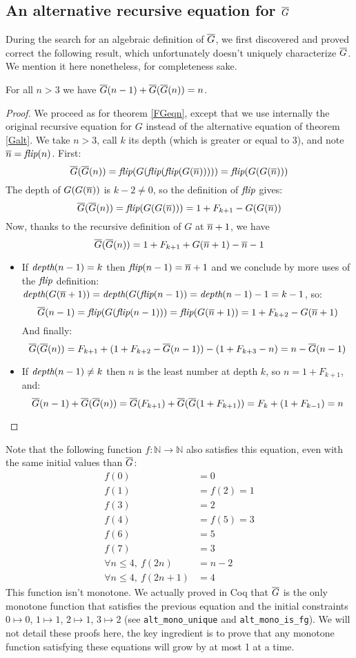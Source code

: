 \documentclass[a4paper,11pt]{article}
\begin{document}
\subsection{An alternative recursive equation for $\overline{G}$}

During the search for an algebraic definition of $\overline{G}$, we
first discovered and proved correct the following result,
which unfortunately doesn't uniquely characterize $\overline{G}$.
We mention it here nonetheless, for completeness sake.

\begin{theorem}
For all $n>3$ we have $\overline{G}(n-1) +\overline{G}(\overline{G}(n)) = n$.
\end{theorem}
\begin{proof}
We proceed as for theorem \ref{FGeqn}, except that we
use internally the original recursive equation for $G$
instead of the alternative equation of theorem \ref{Galt}.
We take $n>3$, call $k$ its depth (which is greater or equal to 3),
and note $\overline{n} = \textit{flip}(n)$. First:
$$\overline{G}(\overline{G}(n))=\textit{flip}(G(\textit{flip}(\textit{flip}(G(\overline{n})))))=\textit{flip}(G(G(\overline{n})))$$
The depth of $G(G(\overline{n}))$ is $k-2\neq 0$, so the definition
of $\textit{flip}$ gives:
$$\overline{G}(\overline{G}(n)) = \textit{flip}(G(G(\overline{n}))) = 1+F_{k+1}-G(G(\overline{n}))$$
Now, thanks to the recursive definition of $G$ at $\overline{n}+1$, we have
$$\overline{G}(\overline{G}(n)) = 1+F_{k+1}+G(\overline{n}+1)-\overline{n}-1$$
\begin{itemize}
\item If $\textit{depth}(n-1)=k$ then $\textit{flip}(n-1)=\overline{n}+1$ and we
conclude by more uses of the $\textit{flip}$ definition:
$\textit{depth}(G(\overline{n}+1))=\textit{depth}(G(\textit{flip}(n-1))=\textit{depth}(n-1)-1=k-1$, so:
$$\overline{G}(n-1)=\textit{flip}(G(\textit{flip}(n-1)))=\textit{flip}(G(\overline{n}+1))= 1+F_{k+2}-G(\overline{n}+1)$$
And finally:
$$\overline{G}(\overline{G}(n)) = F_{k+1} + (1+F_{k+2}-\overline{G}(n-1))-(1+F_{k+3}-n) = n-\overline{G}(n-1)$$

\item If $\textit{depth}(n-1)\neq k$ then $n$ is the least number at
depth $k$, so $n=1+F_{k+1}$, and:
$$\overline{G}(n-1) + \overline{G}(\overline{G}(n)) = \overline{G}(F_{k+1})+\overline{G}(\overline{G}(1+F_{k+1})) =
F_{k}+(1+F_{k-1}) = n$$
\end{itemize}
\end{proof}

Note that the following function $f:\mathbb{N}\to\mathbb{N}$
also satisfies this equation, even with the same initial
values than $\overline{G}$:
\begin{align*}
   f(0) & = 0 \\
   f(1) & = f(2)=1  \\
   f(3) & = 2 \\
   f(4) & =f(5) = 3 \\
   f(6) & = 5 \\
   f(7) & = 3 \\
 \forall n\le 4, ~ f(2n) & = n-2 \\
 \forall n\le 4, ~ f(2n+1) & = 4
\end{align*}
This function isn't monotone. We actually proved in Coq that
$\overline{G}$ is the only monotone function that satisfies the previous
equation and the initial constraints $0\mapsto 0$, $1\mapsto 1$, $2\mapsto 1$, $3\mapsto
2$ (see {\tt alt\_mono\_unique} and {\tt alt\_mono\_is\_fg}).
We will not detail these proofs here, the key ingredient is to
prove that any monotone function satisfying these equations
will grow by at most 1 at a time.
\end{document}
